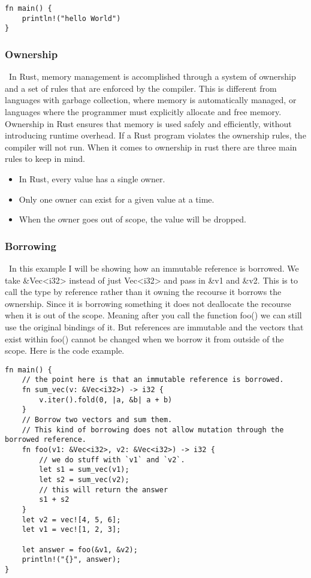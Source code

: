 \documentclass{article}
\theoremstyle{theorem}
\theoremstyle{definition}
\theoremstyle{remark}
\begin{document}
\begin{lstlisting}
fn main() {
    println!("hello World")
}
\end{lstlisting}
\subsubsection{Ownership}\
 In Rust, memory management is accomplished through a system of ownership and a set of rules that are enforced by the compiler. This is different from languages with garbage collection, where memory is automatically managed, or languages where the programmer must explicitly allocate and free memory. Ownership in Rust ensures that memory is used safely and efficiently, without introducing runtime overhead. If a Rust program violates the ownership rules, the compiler will not run. When it comes to ownership in rust there are three main rules to keep in mind.
\begin{itemize}
\item In Rust, every value has a single owner.
\item Only one owner can exist for a given value at a time.
\item When the owner goes out of scope, the value will be dropped.

\end{itemize}

\subsubsection{Borrowing}\
 In this example I will be showing how an immutable reference is borrowed. We take &Vec<i32> instead of just Vec<i32> and pass in &v1 and &v2. This is to call the type by reference rather than it owning the recourse it borrows the ownership. Since it is borrowing something it does not deallocate the recourse when it is out of the scope. Meaning after you call the function foo() we can still use the original bindings of it. But references are immutable and the vectors that exist within foo() cannot be changed when we borrow it from outside of the scope. Here is the code example. 

\begin{lstlisting}
fn main() {
    // the point here is that an immutable reference is borrowed.
    fn sum_vec(v: &Vec<i32>) -> i32 {
        v.iter().fold(0, |a, &b| a + b)
    }
    // Borrow two vectors and sum them.
    // This kind of borrowing does not allow mutation through the borrowed reference.
    fn foo(v1: &Vec<i32>, v2: &Vec<i32>) -> i32 {
        // we do stuff with `v1` and `v2`.
        let s1 = sum_vec(v1);
        let s2 = sum_vec(v2);
        // this will return the answer
        s1 + s2
    }
    let v2 = vec![4, 5, 6];
    let v1 = vec![1, 2, 3];
    
    let answer = foo(&v1, &v2);
    println!("{}", answer);
}
\end{lstlisting}
\end{document}
